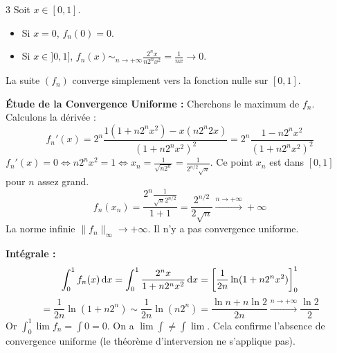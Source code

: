 \begin{correction}{3}
Soit $x \in [0, 1]$.
\begin{itemize}
    \item Si $x = 0$, $f_n(0) = 0$.
    \item Si $x \in ]0, 1]$, $f_n(x) \sim_{n\to+\infty} \frac{2^n x}{n 2^n x^2} = \frac{1}{nx} \to 0$.
\end{itemize}
La suite $(f_n)$ converge simplement vers la fonction nulle sur $[0, 1]$.

\textbf{Étude de la Convergence Uniforme :}
Cherchons le maximum de $f_n$. Calculons la dérivée :
$$ f_n'(x) = 2^n \frac{1(1+n 2^n x^2) - x(n 2^n 2x)}{(1+n 2^n x^2)^2} = 2^n \frac{1 - n 2^n x^2}{(1+n 2^n x^2)^2} $$
$f_n'(x) = 0 \iff n 2^n x^2 = 1 \iff x_n = \frac{1}{\sqrt{n 2^n}} = \frac{1}{2^{n/2}\sqrt{n}}$.
Ce point $x_n$ est dans $[0, 1]$ pour $n$ assez grand.
$$ f_n(x_n) = \frac{2^n \frac{1}{\sqrt{n} 2^{n/2}}}{1+1} = \frac{2^{n/2}}{2\sqrt{n}} \xrightarrow{n\to+\infty} +\infty $$
La norme infinie $\|f_n\|_\infty \to +\infty$. Il n'y a pas convergence uniforme.

\textbf{Intégrale :}
$$ \int_0^1 f_n(x) \,\mathrm{d}x = \int_0^1 \frac{2^n x}{1+n 2^n x^2} \,\mathrm{d}x = \left[ \frac{1}{2n} \ln(1+n 2^n x^2) \right]_0^1 $$
$$ = \frac{1}{2n} \ln(1+n 2^n) \sim \frac{1}{2n} \ln(n 2^n) = \frac{\ln n + n \ln 2}{2n} \xrightarrow{n\to+\infty} \frac{\ln 2}{2} $$
Or $\int_0^1 \lim f_n = \int 0 = 0$.
On a $\lim \int \neq \int \lim$. Cela confirme l'absence de convergence uniforme (le théorème d'interversion ne s'applique pas).
\end{correction}

